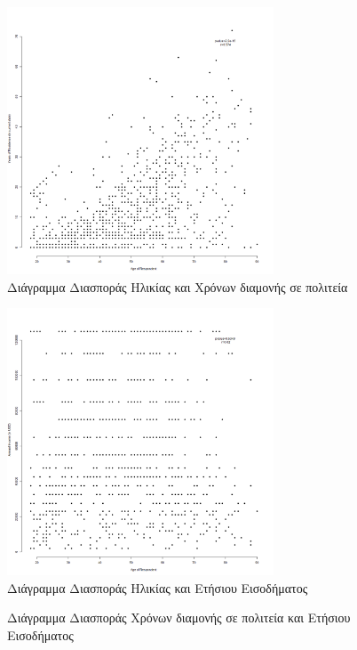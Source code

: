 \documentclass[10pt, letterpaper]{article}
\begin{document}
\begin{center}
\begin{figure}[h]
                \caption{Διάγραμμα Διασποράς Ηλικίας και Χρόνων διαμονής σε πολιτεία}
                \label{ageyearplot}
                \centering
                \includegraphics[width=300px, keepaspectratio]{resources/Age_YearsOfResidency_Plot.png}
            \end{figure}
            \newpage
            \begin{figure}[h]
                \caption{Διάγραμμα Διασποράς Ηλικίας και Ετήσιου Εισοδήματος}
                \label{ageincomenplot}
                \centering
                \includegraphics[width=300px, keepaspectratio]{resources/Age_Income_Plot.png}
            \end{figure}
            \newpage
            \begin{figure}[h]
                \caption{Διάγραμμα Διασποράς Χρόνων διαμονής σε πολιτεία και Ετήσιου Εισοδήματος}
                \label{yearsincomeplot}
                \centering

\end{figure}
\end{center}
\end{document}
